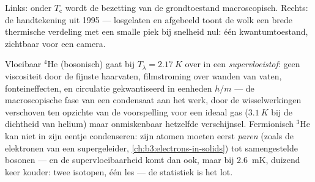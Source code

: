 \begin{omfigure}

{\small Links: onder $T_{\text{c}}$ wordt de bezetting van de
grondtoestand macroscopisch. Rechts: de handtekening uit 1995 ---
losgelaten en afgebeeld toont de wolk een brede thermische verdeling met
een smalle piek bij snelheid nul: één kwantumtoestand, zichtbaar voor een
camera.}
\end{omfigure}

\begin{example}\label{ex:b3:quantum-statistics:helium}
Vloeibaar $^4$He (bosonisch) gaat bij $T_\lambda = \qty{2.17}{K}$ over in
een \emph{supervloeistof}: geen viscositeit door de fijnste haarvaten,
filmstroming over wanden van vaten, fonteineffecten, en circulatie
gekwantiseerd in eenheden $h/m$ --- de macroscopische fase van een
condensaat aan het werk, door de wisselwerkingen verschoven ten opzichte
van de voorspelling voor een ideaal gas ($\qty{3.1}{K}$ bij de dichtheid
van helium) maar onmiskenbaar hetzelfde verschijnsel. Fermionisch $^3$He
kan niet in zijn eentje condenseren: zijn atomen moeten eerst \emph{paren}
(zoals de elektronen van een supergeleider,
\cref{ch:b3:electrons-in-solids}) tot samengestelde bosonen --- en de
supervloeibaarheid komt dan ook, maar bij \qty{2.6}{mK}, duizend keer
kouder: twee isotopen, één les --- de statistiek is het lot.
\end{example}

